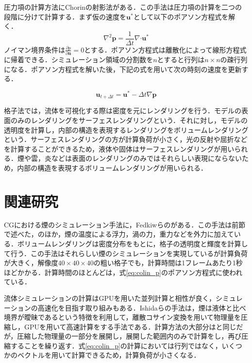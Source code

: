 \documentclass[10pt,a4paper,notitlepage,oneside,twocolumn]{abst_jsarticle}
\begin{document}
圧力項の計算方法にChorinの射影法\cite{projection}がある．この手法は圧力項の計算を二つの段階に分けて計算する．まず仮の速度を$\bm{u}^*$として以下のポアソン方程式を解く．
\begin{equation}\label{eq:colin_p}
\nabla^2 \bm{p} =  \frac{1}{\Delta t}\nabla\boldsymbol{\cdot}\bm{u}^*
\end{equation} 
ノイマン境界条件は$\frac{\partial p}{\partial \bm{n}} = 0$とする．ポアソン方程式は離散化によって線形方程式に帰着できる．シミュレーション領域の分割数を$n$とすると行列は$n \times n$の疎行列になる．ポアソン方程式を解いた後，下記の式を用いて次の時刻の速度を更新する．

$$\bm{u}_{t+\Delta t} = \bm{u}^* - \Delta t \nabla \bm{p}$$

格子法では，流体を可視化する際は密度を元にレンダリングを行う．モデルの表面のみのレンダリングをサーフェスレンダリングという．それに対し，モデルの透明度を計算し，内部の構造を表現するレンダリングをボリュームレンダリングという．サーフェスレンダリングの方が計算負荷が小さく，光の反射や屈折などを計算することができるため，液体や固体はサーフェスレンダリングが用いられる．煙や雲，炎などは表面のレンダリングのみではそれらしい表現にならないため，内部の構造を表現するボリュームレンダリングが用いられる．
\section{関連研究}
CGにおける煙のシミュレーション手法に，Fedkiwらの\cite{fedkiw}がある．この手法は前節で述べた\cite{semi-Lagrangian}，\cite{projection}のほか，煙の温度による浮力，渦の力，重力などを外力に加えている．ボリュームレンダリングは密度分布をもとに，格子の透明度と輝度を計算して行う．この手法はそれらしい煙のシミュレーションを実現しているが計算負荷が大きく，解像度$40\times40\times40$の粗い格子でも，計算時間は1フレームあたり1秒ほどかかる．計算時間のほとんどは，式\ref{eq:colin_p}のポアソン方程式に使われている．

流体シミュレーションの計算はGPUを用いた並列計算と相性が良く，シミュレーションの高速化を目指す取り組みもある．Ishidaらの手法\cite{GPU}は，煙は液体と比べ境界が曖昧であるという特徴を利用して，離散コサイン変換を用いて物理量を圧縮し，GPUを用いて高速計算をする手法である．計算方法の大部分は\cite{fedkiw}と同じだが，圧縮した物理量の一部分を展開し，展開した範囲内のみで計算をし，再び圧縮することを繰り返す．式\ref{eq:colin_p}の計算においては行列ではなく，いくつかのベクトルを用いて計算できるため，計算負荷が小さくなる．
\end{document}
